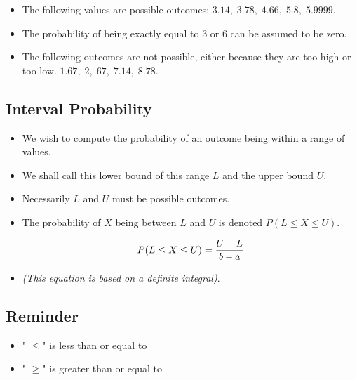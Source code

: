 \documentclass[a4paper,12pt]{article}
\begin{document}
\begin{itemize}
\item  The following values are possible outcomes: $3.14, \;3.78,\; 4.66,\; 5.8,\;5.9999.$ \smallskip
\item  The probability of being exactly equal to $3$ or $6$ can be assumed to be zero. \smallskip
\item  The following outcomes are not possible, either because they are too high or too low.
$1.67,\;2,\;67,\;7.14,\; 8.78.$
\end{itemize}



\subsection*{Interval Probability}

\begin{itemize}
	\item We wish to compute the probability of an outcome being within a range of values.
	\item We shall call this lower bound of this range $L$ and the upper bound $ U$.
	\item Necessarily $L$ and $U$ must be possible outcomes.
	\item The probability of $X$ being between $L$ and $U$ is denoted $P( L \leq X \leq U )$.
	
	\[
	P( L \leq X \leq U ) = { U - L \over b - a}
	\]
	\item \textit{(This equation is based on a definite integral)}.

\end{itemize}



\subsection*{Reminder}

\begin{itemize}
\item " $\leq$" is less than or equal to
	
\item " $\geq$" is greater than or equal to
\end{itemize}
\end{document}
